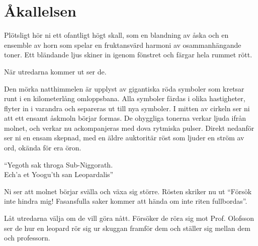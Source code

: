 \section{Åkallelsen}
\label{sek:Akallelsen}
%
\begin{displayquote}
	Plötsligt hör ni ett ofantligt högt skall, som en blandning av åska och en ensemble av horn som spelar en fruktansvärd harmoni av osammanhängande toner. Ett bländande ljus skiner in igenom fönstret och färgar hela rummet rött.
\end{displayquote}
%
När utredarna kommer ut ser de.

\begin{displayquote}
	Den mörka natthimmelen är upplyst av gigantiska röda symboler som kretsar runt i en kilometerlång omloppsbana. Alla symboler färdas i olika hastigheter, flyter in i varandra och separeras ut till nya symboler. I mitten av cirkeln ser ni att ett ensamt åskmoln börjar formas. De ohyggliga tonerna verkar ljuda ifrån molnet, och verkar nu ackompanjeras med dova rytmiska pulser. Direkt nedanför ser ni en ensam skepnad, med en äldre auktoritär röst som ljuder en ström av ord, okända för era öron.
	\begin{center}
		``Yegoth sak throga Sub-Niggorath. \\
		Ech'a et Yoogu'th san Leopardalis''
	\end{center}
	Ni ser att molnet börjar svälla och växa sig större. Rösten skriker nu ut ``Försök inte hindra mig! Fasansfulla saker kommer att hända om inte riten fullbordas''.
\end{displayquote}
%
Låt utredarna välja om de vill göra nått. Försöker de röra sig mot Prof. Olofsson ser de hur en leopard \sectiondescribe{\ref{var:Leopard}} rör sig ur skuggan framför dem och ställer sig mellan dem och professorn.

